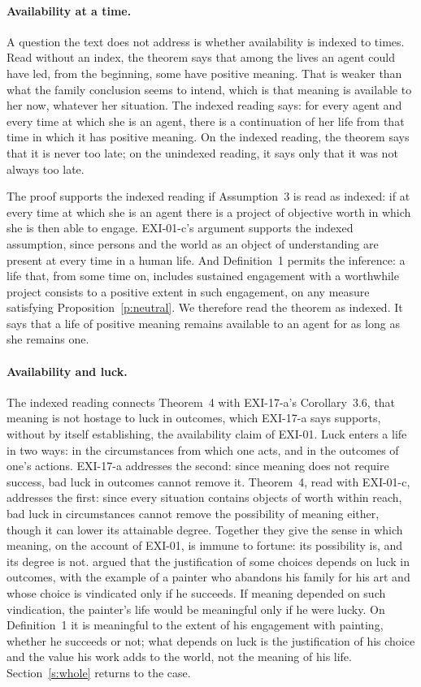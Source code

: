 \paragraph{Availability at a time.} A question the text does not address is whether availability is indexed to times. Read without an index, the theorem says that among the lives an agent could have led, from the beginning, some have positive meaning. That is weaker than what the family conclusion seems to intend, which is that meaning is available to her now, whatever her situation. The indexed reading says: for every agent and every time at which she is an agent, there is a continuation of her life from that time in which it has positive meaning. On the indexed reading, the theorem says that it is never too late; on the unindexed reading, it says only that it was not always too late.

The proof supports the indexed reading if Assumption~3 is read as indexed: if at every time at which she is an agent there is a project of objective worth in which she is then able to engage. EXI-01-c's argument supports the indexed assumption, since persons and the world as an object of understanding are present at every time in a human life. And Definition~1 permits the inference: a life that, from some time on, includes sustained engagement with a worthwhile project consists to a positive extent in such engagement, on any measure satisfying Proposition~\ref{p:neutral}. We therefore read the theorem as indexed. It says that a life of positive meaning remains available to an agent for as long as she remains one.

\paragraph{Availability and luck.} The indexed reading connects Theorem~4 with EXI-17-a's Corollary~3.6, that meaning is not hostage to luck in outcomes, which EXI-17-a says supports, without by itself establishing, the availability claim of EXI-01. Luck enters a life in two ways: in the circumstances from which one acts, and in the outcomes of one's actions. EXI-17-a addresses the second: since meaning does not require success, bad luck in outcomes cannot remove it. Theorem~4, read with EXI-01-c, addresses the first: since every situation contains objects of worth within reach, bad luck in circumstances cannot remove the possibility of meaning either, though it can lower its attainable degree. Together they give the sense in which meaning, on the account of EXI-01, is immune to fortune: its possibility is, and its degree is not. \citet{Williams1981b} argued that the justification of some choices depends on luck in outcomes, with the example of a painter who abandons his family for his art and whose choice is vindicated only if he succeeds. If meaning depended on such vindication, the painter's life would be meaningful only if he were lucky. On Definition~1 it is meaningful to the extent of his engagement with painting, whether he succeeds or not; what depends on luck is the justification of his choice and the value his work adds to the world, not the meaning of his life. Section~\ref{s:whole} returns to the case.

